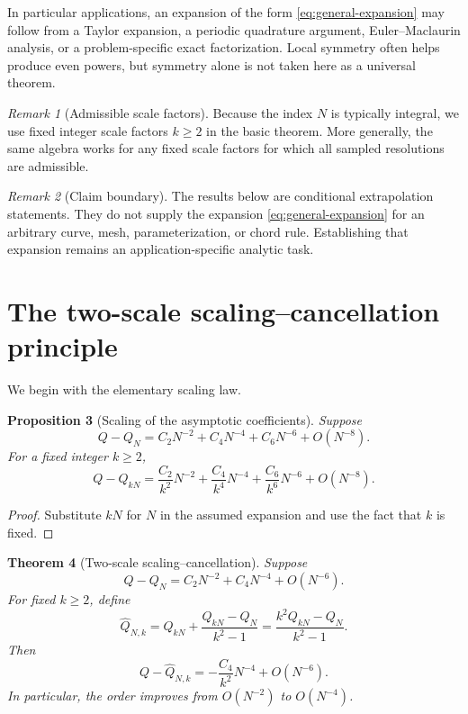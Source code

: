 \documentclass[11pt]{article}
\newtheorem{theorem}{Theorem}[section]
\newtheorem{proposition}[theorem]{Proposition}
\theoremstyle{remark}
\newtheorem{remark}[theorem]{Remark}
\newcommand{\wideQ}{\widehat{Q}}
\begin{document}
In particular applications, an expansion of the form
\eqref{eq:general-expansion} may follow from a Taylor expansion, a periodic
quadrature argument, Euler--Maclaurin analysis, or a problem-specific exact
factorization.  Local symmetry often helps produce even powers, but symmetry
alone is not taken here as a universal theorem.

\begin{remark}[Admissible scale factors]
Because the index $N$ is typically integral, we use fixed integer scale
factors $k\ge2$ in the basic theorem.  More generally, the same algebra works
for any fixed scale factors for which all sampled resolutions are admissible.
\end{remark}

\begin{remark}[Claim boundary]
The results below are conditional extrapolation statements.  They do not
supply the expansion \eqref{eq:general-expansion} for an arbitrary curve,
mesh, parameterization, or chord rule.  Establishing that expansion remains
an application-specific analytic task.
\end{remark}

\section{The two-scale scaling--cancellation principle}

We begin with the elementary scaling law.

\begin{proposition}[Scaling of the asymptotic coefficients]
\label{prop:scaling}
Suppose
\[
Q-Q_N
=
C_2N^{-2}+C_4N^{-4}+C_6N^{-6}+O(N^{-8}).
\]
For a fixed integer $k\ge2$,
\[
Q-Q_{kN}
=
\frac{C_2}{k^2}N^{-2}
+
\frac{C_4}{k^4}N^{-4}
+
\frac{C_6}{k^6}N^{-6}
+O(N^{-8}).
\]
\end{proposition}

\begin{proof}
Substitute $kN$ for $N$ in the assumed expansion and use the fact that $k$
is fixed.
\end{proof}

\begin{theorem}[Two-scale scaling--cancellation]
\label{thm:two-scale}
Suppose
\begin{equation}
\label{eq:two-scale-assumption}
Q-Q_N
=
C_2N^{-2}+C_4N^{-4}+O(N^{-6}).
\end{equation}
For fixed $k\ge2$, define
\begin{equation}
\label{eq:two-scale-def}
\wideQ_{N,k}
=
Q_{kN}+\frac{Q_{kN}-Q_N}{k^2-1}
=
\frac{k^2Q_{kN}-Q_N}{k^2-1}.
\end{equation}
Then
\begin{equation}
\label{eq:two-scale-error}
Q-\wideQ_{N,k}
=
-\frac{C_4}{k^2}N^{-4}+O(N^{-6}).
\end{equation}
In particular, the order improves from $O(N^{-2})$ to $O(N^{-4})$.
\end{theorem}
\end{document}
